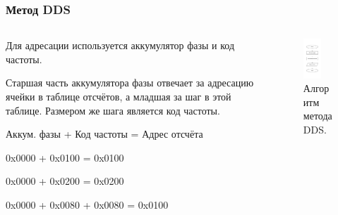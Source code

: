 \documentclass[10pt]{beamer}
\begin{document}
\begin{frame}
\frametitle{Метод DDS}
\begin{columns}
\begin{column}{0.55\textwidth}
  	Для адресации используется аккумулятор фазы и код частоты. 
\vspace{0.25cm}

	Старшая часть аккумулятора фазы отвечает за адресацию ячейки в таблице отсчётов, а младшая за шаг в этой таблице. Размером же шага является код частоты.

\vspace{0.25cm}
	Аккум. фазы + Код частоты = Адрес отсчёта 
	
	0x0000 + 0x0100 = 0x0100

	0x0000 + 0x0200 = 0x0200
	
	0x0000 + 0x0080 + 0x0080 = 0x0100
\end{column}
\begin{column}{0.45\textwidth}  
    \begin{center}
    \begin{figure}
    \includegraphics[width=0.6\textwidth]{dds_block}
     \caption{Алгоритм метода DDS.}
    \end{figure}
     \end{center}
\end{column}
\end{columns}
\end{frame}
\end{document}
